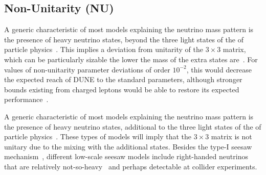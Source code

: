 \subsection{Non-Unitarity (NU)}
A generic characteristic of most models explaining the neutrino mass
pattern is the presence of heavy neutrino states, beyond the
three light states of the   of particle
physics~\cite{Minkowski:1977sc,Mohapatra:1979ia,Yanagida:1979as,GellMann:1980vs}. This implies a deviation from unitarity of the $3\times3$  matrix, which can be particularly sizable the lower the mass of the extra states are~\cite{Mohapatra:1986bd,Akhmedov:1995vm,Akhmedov:1995ip,Malinsky:2005bi}.
For values of non-unitarity parameter deviations of order $10^{-2}$, this would decrease the expected reach of DUNE to the standard parameters, although stronger bounds existing from charged leptons would be able to restore its expected performance~\cite{Blennow:2016jkn,Escrihuela:2016ube}.

A generic characteristic of most models explaining the neutrino mass
pattern is the presence of heavy neutrino states, additional to the
three light states of the   of particle
physics~\cite{Mohapatra:1998rq,Valle:2015pba,Fukugita:2003en}. These
types of models will imply that the $3\times3$  matrix is not
unitary due to the mixing with the additional states.  Besides the
type-I seesaw
mechanism~\cite{GellMann:1980vs,Yanagida:1979as,Mohapatra:1979ia,Schechter:1980gr},
different low-scale seesaw models include right-handed neutrinos that
are relatively not-so-heavy~\cite{Mohapatra:1986bd} and perhaps
detectable at collider experiments.

